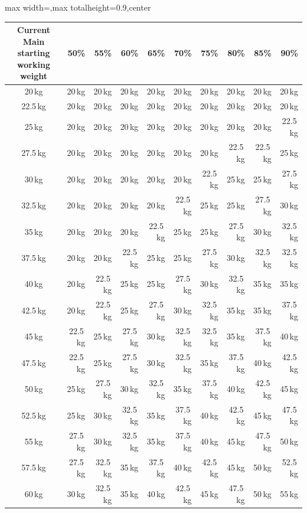 \documentclass[11pt,a4paper]{article}
\newcommand{\tablearraystretch}{1.15}
\begin{document}
\begin{center}
\renewcommand{\arraystretch}{\tablearraystretch}
\begin{adjustbox}{max width=\linewidth,max totalheight=0.9\textheight,center}
\begin{tabular}{crrrrrrrrr}
\toprule
Current Main starting working weight & 50\% & 55\% & 60\% & 65\% & 70\% & 75\% & 80\% & 85\% & 90\% \\
\midrule
20\,kg   & 20\,kg & 20\,kg & 20\,kg & 20\,kg & 20\,kg & 20\,kg & 20\,kg & 20\,kg & 20\,kg \\
22.5\,kg & 20\,kg & 20\,kg & 20\,kg & 20\,kg & 20\,kg & 20\,kg & 20\,kg & 20\,kg & 20\,kg \\
25\,kg   & 20\,kg & 20\,kg & 20\,kg & 20\,kg & 20\,kg & 20\,kg & 20\,kg & 20\,kg & 22.5\,kg \\
27.5\,kg & 20\,kg & 20\,kg & 20\,kg & 20\,kg & 20\,kg & 20\,kg & 22.5\,kg & 22.5\,kg & 25\,kg \\
30\,kg   & 20\,kg & 20\,kg & 20\,kg & 20\,kg & 20\,kg & 22.5\,kg & 25\,kg & 25\,kg & 27.5\,kg \\
32.5\,kg & 20\,kg & 20\,kg & 20\,kg & 20\,kg & 22.5\,kg & 25\,kg & 25\,kg & 27.5\,kg & 30\,kg \\
35\,kg   & 20\,kg & 20\,kg & 20\,kg & 22.5\,kg & 25\,kg & 25\,kg & 27.5\,kg & 30\,kg & 32.5\,kg \\
37.5\,kg & 20\,kg & 20\,kg & 22.5\,kg & 25\,kg & 25\,kg & 27.5\,kg & 30\,kg & 32.5\,kg & 32.5\,kg \\
40\,kg   & 20\,kg & 22.5\,kg & 25\,kg & 25\,kg & 27.5\,kg & 30\,kg & 32.5\,kg & 35\,kg & 35\,kg \\
42.5\,kg & 20\,kg & 22.5\,kg & 25\,kg & 27.5\,kg & 30\,kg & 32.5\,kg & 35\,kg & 35\,kg & 37.5\,kg \\
45\,kg   & 22.5\,kg & 25\,kg & 27.5\,kg & 30\,kg & 32.5\,kg & 32.5\,kg & 35\,kg & 37.5\,kg & 40\,kg \\
47.5\,kg & 22.5\,kg & 25\,kg & 27.5\,kg & 30\,kg & 32.5\,kg & 35\,kg & 37.5\,kg & 40\,kg & 42.5\,kg \\
50\,kg   & 25\,kg & 27.5\,kg & 30\,kg & 32.5\,kg & 35\,kg & 37.5\,kg & 40\,kg & 42.5\,kg & 45\,kg \\
52.5\,kg & 25\,kg & 30\,kg & 32.5\,kg & 35\,kg & 37.5\,kg & 40\,kg & 42.5\,kg & 45\,kg & 47.5\,kg \\
55\,kg   & 27.5\,kg & 30\,kg & 32.5\,kg & 35\,kg & 37.5\,kg & 40\,kg & 45\,kg & 47.5\,kg & 50\,kg \\
57.5\,kg & 27.5\,kg & 32.5\,kg & 35\,kg & 37.5\,kg & 40\,kg & 42.5\,kg & 45\,kg & 50\,kg & 52.5\,kg \\
60\,kg   & 30\,kg & 32.5\,kg & 35\,kg & 40\,kg & 42.5\,kg & 45\,kg & 47.5\,kg & 50\,kg & 55\,kg \\
\bottomrule
\end{tabular}
\end{adjustbox}
\renewcommand{\arraystretch}{1}
\end{center}
\end{document}
